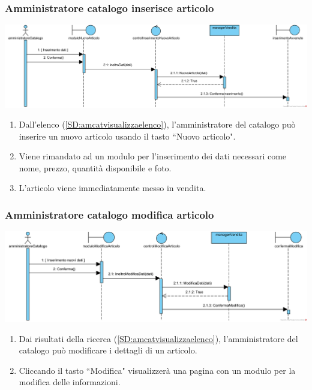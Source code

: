 \documentclass[12pt,a4paper]{article}
\begin{document}
\subsubsection{Amministratore catalogo inserisce articolo}
\label{SD:amcatinseriscearticolo}
\begin{center}
\includegraphics[width=\textwidth]{SequenceDiagram/AmministratoreCatalogoVenditaCrea}
\end{center}

\begin{enumerate}
\item Dall'elenco (\ref{SD:amcatvisualizzaelenco}), l'amministratore del catalogo può inserire un nuovo articolo usando il tasto ``Nuovo articolo".
\item Viene rimandato ad un modulo per l'inserimento dei dati necessari come nome, prezzo, quantità disponibile e foto.
\item L'articolo viene immediatamente messo in vendita.
\end{enumerate}

\subsubsection{Amministratore catalogo modifica articolo}
\label{SD:amcatmodificaarticolo}
\begin{center}
\includegraphics[width=\textwidth]{SequenceDiagram/AmministratoreCatalogoVenditaModifica}
\end{center}

\begin{enumerate}
\item Dai risultati della ricerca (\ref{SD:amcatvisualizzaelenco}), l'amministratore del catalogo può modificare i dettagli di un articolo.
\item Cliccando il tasto ``Modifica" visualizzerà una pagina con un modulo per la modifica delle informazioni.
\end{enumerate}
\end{document}
